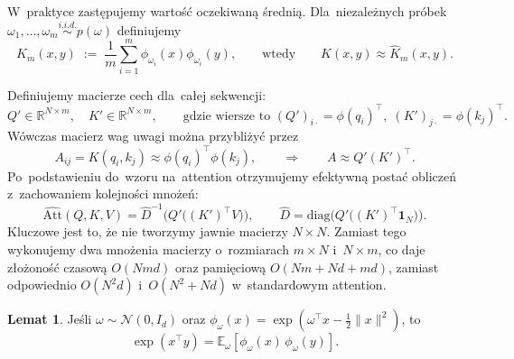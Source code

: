 \documentclass[a4paper,11pt,twoside]{report}
\theoremstyle{definition}
\newtheorem{lemma}[theorem]{Lemat}
\begin{document}

W~praktyce zastępujemy wartość oczekiwaną średnią. Dla~niezależnych próbek $\omega_1,\dots,\omega_m \overset{i.i.d.}{\sim} p(\omega)$ definiujemy
\begin{equation}
\widehat{K}_m(x,y)
\;:=\;
\frac{1}{m}\sum_{i=1}^m \phi_{\omega_i}(x) \phi_{\omega_i}(y),
\qquad \text{wtedy}\qquad
K(x,y) \approx \widehat{K}_m(x,y).
\end{equation}


Definiujemy macierze cech dla~całej sekwencji:
\begin{equation}\label{eq:QKprime}
Q' \in \mathbb{R}^{N\times m}, \quad K' \in \mathbb{R}^{N\times m},
\qquad
\text{gdzie wiersze to } (Q')_{i\cdot}=\phi(q_i)^\top,\; (K')_{j\cdot}=\phi(k_j)^\top.
\end{equation}
Wówczas macierz wag uwagi można przybliżyć przez
\begin{equation}
A_{ij} = K(q_i,k_j) \approx \phi(q_i)^\top\phi(k_j),
\qquad\Rightarrow\qquad
A \approx Q'(K')^\top.
\end{equation}
Po~podstawieniu do~wzoru na~attention otrzymujemy efektywną postać obliczeń
z~zachowaniem kolejności mnożeń:
\begin{equation}
\widehat{\mathrm{Att}}(Q,K,V)=\widehat{D}^{-1}\Big( Q'\big((K')^\top V\big)\Big),
\qquad
\widehat{D}=\mathrm{diag}\Big(Q'\big((K')^\top \mathbf{1}_N\big)\Big).
\label{eq:favor_attention}
\end{equation}
Kluczowe jest to, że nie tworzymy jawnie macierzy $N\times N$.
Zamiast tego wykonujemy dwa mnożenia macierzy o~rozmiarach $m\times N$ i~$N\times m$,
co daje złożoność czasową $O(N m d)$ oraz pamięciową $O(Nm + Nd + md)$,
zamiast odpowiednio $O(N^2 d)$ i~$O(N^2 + Nd)$ w~standardowym attention.


\begin{lemma}
Jeśli $\omega \sim \mathcal N(0, I_d)$ oraz $ 
\phi_\omega(x) = \exp\!\left(\omega^\top x - \tfrac12 \|x\|^2\right)$,
to
\begin{equation}
\exp(x^\top y)
= \mathbb{E}_{\omega}\!\left[\phi_\omega(x)\,\phi_\omega(y)\right].
\end{equation}
\end{lemma}
\end{document}
